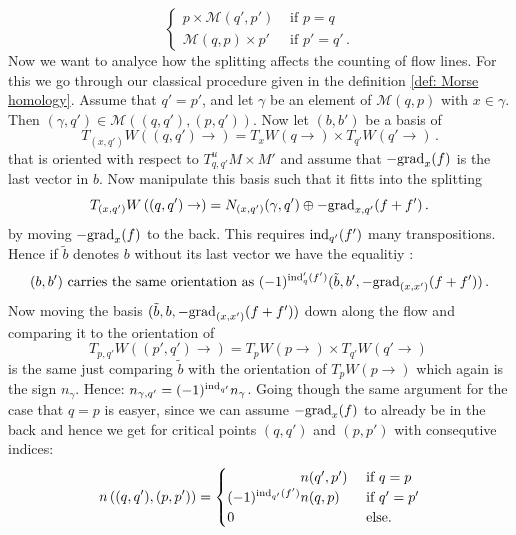 \begin{definition}
\begin{equation*}
\begin{cases}
			p\times \mathcal{M}(q',p')&\text{ if } p=q\\
			\mathcal{M}(q,p)\times p' &\text{ if } p'=q' \,.
		\end{cases}
	\end{equation*}
	Now we want to analyce how the splitting affects the counting of flow lines. For this we go through our classical procedure given in the definition \ref{def: Morse homology}. Assume that $q'=p'$, and let $\gamma$ be an element of $\mathcal{M}(q,p)$ with $x\in \gamma$. Then $(\gamma,q')\in \mathcal{M}\left((q,q'),(p,q')\right)$. Now let $(b,b')$ be a basis of  
	\begin{equation*}
		T_{(x,q')}W\left((q,q')\to \right)=T_xW(q\to) \times T_{q'}W(q' \to )\,.
	\end{equation*} that is oriented with respect to $T^u_{q,q'}M\times M'$ and assume that $-\mathrm{grad}_x(f)$ is the last vector in $b$. Now manipulate this basis such that it fitts into the splitting 
	\begin{equation*}
			T_{(x,q')}W\left((q,q')\to \right)=N_{(x,q')}(\gamma,q')\oplus -\mathrm{grad}_{x,q'}(f+f')\,.
	\end{equation*}by moving $-\mathrm{grad}_x(f)$ to the back. This requires $\mathrm{ind}_{q'}(f')$ many transpositions. Hence if $\tilde{b}$ denotes $b$ without its last vector we have the equalitiy :
	\begin{equation*}
		(b,b') \text{ carries the same orientation as } (-1)^{\mathrm{ind}_q'(f')}(\tilde{b},b',-\mathrm{grad}_{(x,x')}(f+f'))\,.
	\end{equation*} Now moving the basis $(\tilde{b},b,-\mathrm{grad}_{(x,x')}(f+f'))$ down along the flow and comparing it to the orientation of 
	\begin{equation*}
		T_{p,q'}W((p',q')\to ) = T_{p}W(p\to )\times T_{q'}W(q' \to)~ 
	\end{equation*}
	 is the same just comparing $\tilde{b}$ with the orientation of $ T_{p}W(p\to )$ which again is the sign $n_{\gamma}$. Hence:
	$n_{\gamma,q'}=(-1)^{\mathrm{ind}_{q'}}n_\gamma$. Going though the same argument for the case that $q=p$ is easyer, since we can assume $-\mathrm{grad}_x(f)$ to already be in the back and hence we get for critical points $(q,q')$ and $(p,p')$ with consequtive indices:
	\begin{equation*}
		n\left((q,q'),(p,p') \right)=\begin{cases}
			\phantom{(-1)^{\ind_{q'}(f')}}n(q',p') & \text{ if } q=p\\
			(-1)^{\ind_{q'}(f')} n(q,p) & \text{ if } q'=p'\\
			0& \text{ else.}
		\end{cases}
	\end{equation*}
	\end{definition}
